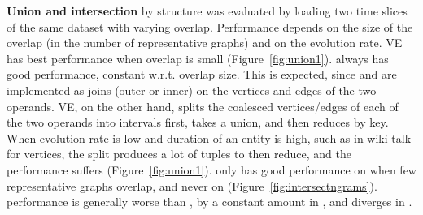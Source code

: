 {\bf Union and intersection} by structure was evaluated by loading two
time slices of the same dataset with varying overlap.  Performance
depends on the size of the overlap (in the number of representative
graphs) and on the evolution rate.  VE has best performance when
overlap is small (Figure~\ref{fig:union1}).  \og always has good performance, constant
w.r.t. overlap size.  This is expected, since \og {} and
 are implemented as joins (outer or inner) on the
vertices and edges of the two operands.  VE, on the other hand, splits
the coalesced vertices/edges of each of the two operands into
intervals first, takes a union, and then reduces by key.  When
evolution rate is low and duration of an entity is high, such as in
wiki-talk for vertices, the split produces a lot of tuples to then
reduce, and the performance suffers (Figure~\ref{fig:union1}). \sg
only has good performance on  when few
representative graphs overlap, and never on 
(Figure~\ref{fig:intersectngrams}). \hg performance is generally worse
than \og, by a constant amount in , and diverges in
.

